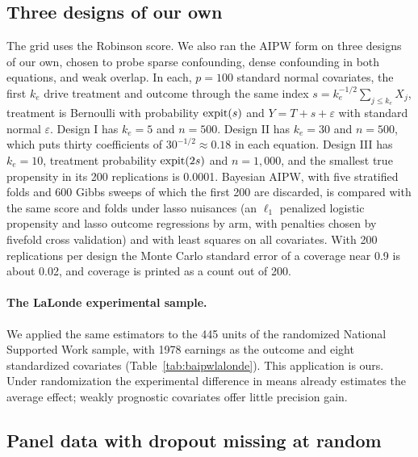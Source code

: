 \subsection{Three designs of our own}

The grid uses the Robinson score. We also ran the AIPW form on three designs of our own, chosen to probe sparse confounding, dense confounding in both equations, and weak overlap. In each, $p = 100$ standard normal covariates, the first $k_e$ drive treatment and outcome through the same index $s = k_e^{-1/2}\sum_{j \leq k_e}X_j$, treatment is Bernoulli with probability $\operatorname{expit}(s)$ and $Y = T + s + \varepsilon$ with standard normal $\varepsilon$. Design I has $k_e = 5$ and $n = 500$. Design II has $k_e = 30$ and $n = 500$, which puts thirty coefficients of $30^{-1/2} \approx 0.18$ in each equation. Design III has $k_e = 10$, treatment probability $\operatorname{expit}(2s)$ and $n = 1{,}000$, and the smallest true propensity in its 200 replications is 0.0001. Bayesian AIPW, with five stratified folds and 600 Gibbs sweeps of which the first 200 are discarded, is compared with the same score and folds under lasso nuisances (an $\ell_1$ penalized logistic propensity and lasso outcome regressions by arm, with penalties chosen by fivefold cross validation) and with least squares on all covariates. With 200 replications per design the Monte Carlo standard error of a coverage near 0.9 is about 0.02, and coverage is printed as a count out of 200.



\paragraph{The LaLonde experimental sample.} We applied the same estimators to the 445 units of the randomized National Supported Work sample, with 1978 earnings as the outcome and eight standardized covariates (Table~\ref{tab:baipwlalonde}). This application is ours. Under randomization the experimental difference in means already estimates the average effect; weakly prognostic covariates offer little precision gain.



\subsection{Panel data with dropout missing at random}

